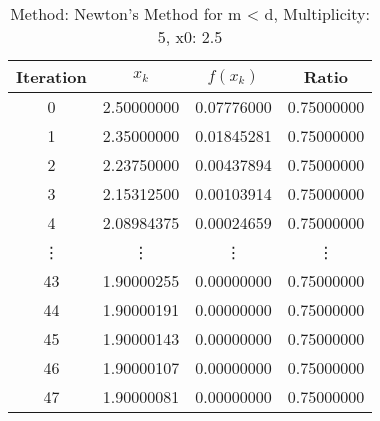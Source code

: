 \begin{table}
\centering
\caption{Method: Newton's Method for m < d, Multiplicity: 5, x0: 2.5}
\label{tab:table_Newton's_Method_for_m_<_d_5_2_5}
\begin{tabular}{c c c c}
\toprule
Iteration &      $x_k$ &   $f(x_k)$ &      Ratio \\
\midrule
        0 & 2.50000000 & 0.07776000 & 0.75000000 \\
        1 & 2.35000000 & 0.01845281 & 0.75000000 \\
        2 & 2.23750000 & 0.00437894 & 0.75000000 \\
        3 & 2.15312500 & 0.00103914 & 0.75000000 \\
        4 & 2.08984375 & 0.00024659 & 0.75000000 \\
   \vdots &     \vdots &     \vdots &     \vdots \\
       43 & 1.90000255 & 0.00000000 & 0.75000000 \\
       44 & 1.90000191 & 0.00000000 & 0.75000000 \\
       45 & 1.90000143 & 0.00000000 & 0.75000000 \\
       46 & 1.90000107 & 0.00000000 & 0.75000000 \\
       47 & 1.90000081 & 0.00000000 & 0.75000000 \\
\bottomrule
\end{tabular}
\end{table}
